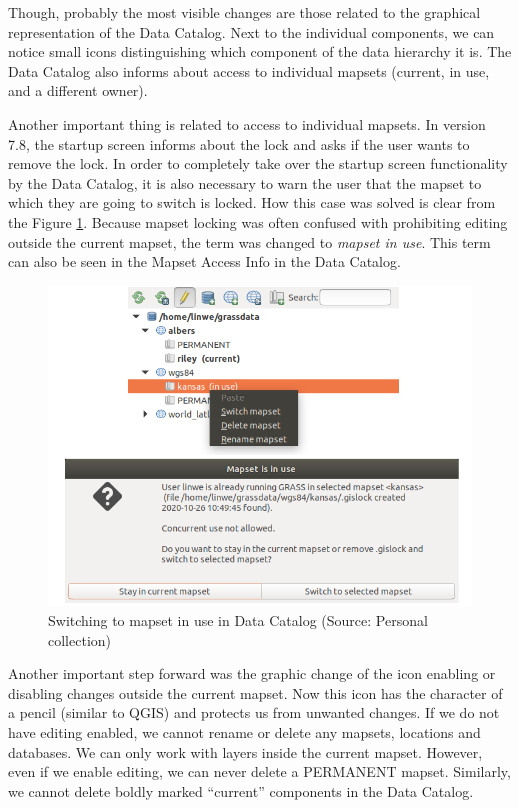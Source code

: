 \documentclass[a4paper,10pt,twoside]{article}
\begin{document}
\newpage Though, probably the most visible changes are those related to the graphical representation of the Data Catalog. Next to the individual components, we can notice small icons distinguishing which component of the data hierarchy it is. The Data Catalog also informs about access to individual mapsets (current, in use, and a different owner).

Another important thing is related to access to individual mapsets. In version 7.8, the startup screen informs about the lock and asks if the user wants to remove the lock.
In order to completely take over the startup screen functionality by the Data Catalog, it is also necessary to warn the user that the mapset to which they are going to switch is locked. How this case was solved is clear from the Figure \ref{fig:data_catalog_switch_new}. Because mapset locking was often confused with prohibiting editing outside the current mapset, the term was changed to \textit{mapset in use}. This term can also be seen in the Mapset Access Info in the Data Catalog.

\vspace{0.3cm}
\begin{figure}[hbt!] 
\begin{center}
\includegraphics[width=13cm]{../pictures/data_catalog_switch.png} 
\caption[Switching to mapset in use in Data Catalog]{Switching to mapset in use in Data Catalog (Source: Personal collection)}
\label{fig:data_catalog_switch_new}
\end{center}
\end{figure}

\noindent Another important step forward was the graphic change of the icon enabling or disabling changes outside the current mapset. Now this icon has the character of a pencil (similar to QGIS) and protects us from unwanted changes. If we do not have editing enabled, we cannot rename or delete any mapsets, locations and databases. We can only work with layers inside the current mapset. However, even if we enable editing, we can never delete a PERMANENT mapset. Similarly, we cannot delete boldly marked ``current” components in the Data Catalog.
\end{document}
